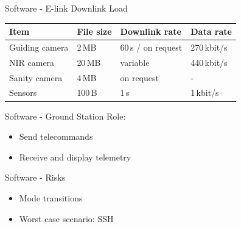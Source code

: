 \documentclass[11pt, aspectratio=169]{beamer}
\begin{document}
    \begin{frame}[t]{Software - E-link Downlink Load}
        \centering
        \vspace{1cm}
        \begin{center}
            \begin{tabular}{| l | l | l | l |}
                \hline
                \textbf{Item} & \textbf{File size} & \textbf{Downlink rate} & \textbf{Data rate} \\\hline\hline

                Guiding camera    & 2\,MB     & 60\,s / on request    & 270\,kbit/s  \\\hline
                NIR camera        & 20\,MB    & variable              & 440\,kbit/s  \\\hline
                Sanity camera     & 4\,MB     & on request            & -            \\\hline
                Sensors           & 100\,B    & 1\,s                  & 1\,kbit/s    \\\hline
            \end{tabular}
        \end{center}

    \end{frame}


    \begin{frame}[c]{Software - Ground Station}
        Role:
        \begin{itemize}
            \item Send telecommands
            \item Receive and display telemetry
        \end{itemize}
    \end{frame}

    \begin{frame}[c]{Software - Risks}
        \begin{itemize}
            \item Mode transitions
            \item Worst case scenario: SSH
        \end{itemize}
    \end{frame}
\end{document}
